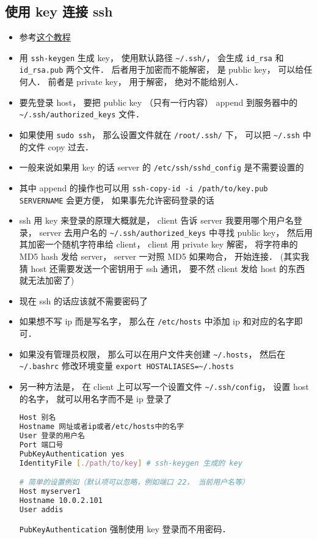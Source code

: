 \subsection{使用 key 连接 ssh}
\begin{itemize}
\item 参考\href{https://www.digitalocean.com/community/tutorials/ssh-essentials-working-with-ssh-servers-clients-and-keys}{这个教程}
\item 用 \verb`ssh-keygen` 生成 key， 使用默认路径 \verb`~/.ssh/`， 会生成 \verb`id_rsa` 和 \verb`id_rsa.pub` 两个文件． 后者用于加密而不能解密， 是 public key， 可以给任何人． 前者是 private key， 用于解密， 绝对不能给别人．
\item 要先登录 host， 要把 public key （只有一行内容） append 到服务器中的 \verb`~/.ssh/authorized_keys` 文件．
\item 如果使用 \verb|sudo ssh|， 那么设置文件就在 \verb|/root/.ssh/| 下， 可以把 \verb|~/.ssh| 中的文件 copy 过去．
\item 一般来说如果用 key 的话 server 的 \verb`/etc/ssh/sshd_config` 是不需要设置的
\item 其中 append 的操作也可以用 \verb`ssh-copy-id -i /path/to/key.pub SERVERNAME` 会更方便， 如果事先允许密码登录的话
\item ssh 用 key 来登录的原理大概就是， client 告诉 server 我要用哪个用户名登录， server 去用户名的 \verb`~/.ssh/authorized_keys` 中寻找 public key， 然后用其加密一个随机字符串给 client， client 用 private key 解密， 将字符串的 MD5 hash 发给 server， server 一对照 MD5 如果吻合， 开始连接．  (其实我猜 host 还需要发送一个密钥用于 ssh 通讯， 要不然 client 发给 host 的东西就无法加密了)
\item 现在 ssh 的话应该就不需要密码了
\item 如果想不写 ip 而是写名字， 那么在 \verb|/etc/hosts| 中添加 ip 和对应的名字即可．
\item 如果没有管理员权限， 那么可以在用户文件夹创建 \verb|~/.hosts|， 然后在 \verb|~/.bashrc| 修改环境变量 \verb|export HOSTALIASES=~/.hosts|
\item 另一种方法是， 在 client 上可以写一个设置文件 \verb`~/.ssh/config`， 设置 host 的名字， 就可以用名字而不是 ip 登录了
\begin{lstlisting}[language=bash]
Host 别名
Hostname 网址或者ip或者/etc/hosts中的名字
User 登录的用户名
Port 端口号
PubKeyAuthentication yes
IdentityFile [./path/to/key] # ssh-keygen 生成的 key

# 简单的设置例如（默认项可以忽略，例如端口 22， 当前用户名等）
Host myserver1
Hostname 10.0.2.101
User addis
\end{lstlisting}
\verb|PubKeyAuthentication| 强制使用 key 登录而不用密码．


\end{itemize}
